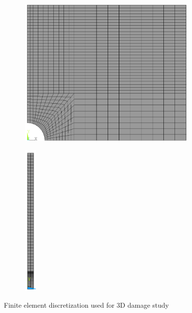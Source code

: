 \documentclass[12pt,a4paper,twoside,openright]{report}
\begin{document}
\begin{figure}[htbp!]
	\centering
       \captionsetup[subfigure]{justification=centering}
     \begin{subfigure}{0.4\textwidth}
     	\centering
         \includegraphics[width=10cm,height=7.5cm]{27.Mesh.png}
         \label{fig:plate with hole mesh 1}
     \end{subfigure}
    \hspace{2.5cm}
     \captionsetup[subfigure]{justification=centering}
     \begin{subfigure}{0.4\textwidth}
     \centering
         \includegraphics[width=0.8cm,height=7.7cm]{27.Mesh2.png}
         \label{fig:plate with hole mesh 2}
         \end{subfigure}
          \caption{Finite element discretization used for 3D damage study}
        \label{fig:plate with hole mesh} 
\end{figure}
\FloatBarrier 
\vspace*{0.3cm}
\end{document}
